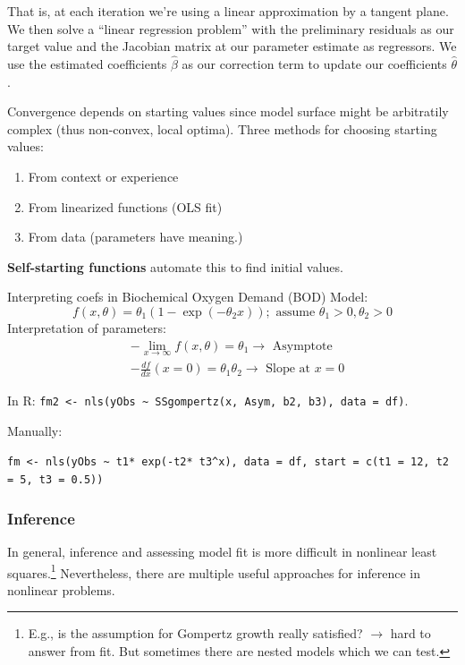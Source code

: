 \documentclass[11pt, %
	oneside, %
	english, %
	onehalfspacing, %
	]{article} %
\numberwithin{equation}{section}
\begin{document}
That is, at each iteration we're using a linear approximation by a tangent plane. We then solve a ``linear regression problem'' with the preliminary residuals as our target value and the Jacobian matrix at our parameter estimate as regressors. We use the estimated coefficients $\hat{\beta}$ as our correction term to update our coefficients $\hat{\theta}$.

Convergence depends on starting values since model surface might be arbitratily complex (thus non-convex, local optima). Three methods for choosing starting values:

\begin{enumerate}
	\item From context or experience
	\item From linearized functions (OLS fit)
	\item From data (parameters have meaning.)
\end{enumerate}

\textbf{Self-starting functions} automate this to find initial values.

\begin{example}{Interpreting coefs in Biochemical Oxygen Demand (BOD)}{}
    Model:
    $$
    f(x, \theta)=\theta_1\left(1-\exp \left(-\theta_2 x\right)\right) ; \text { assume } \theta_1>0, \theta_2>0
    $$
    Interpretation of parameters:
    $$
    \begin{aligned}
    & -\lim _{x \rightarrow \infty} f(x, \theta)=\theta_1 \rightarrow \text { Asymptote } \\
    & -\frac{d f}{d x}(x=0)=\theta_1 \theta_2 \rightarrow \text { Slope at } x=0
    \end{aligned}
    $$
\end{example}

In R: \lstinline|fm2 <- nls(yObs ~ SSgompertz(x, Asym, b2, b3), data = df)|.

Manually:

\lstinline|fm <- nls(yObs ~ t1* exp(-t2* t3^x), data = df, start = c(t1 = 12, t2 = 5, t3 = 0.5))|


\subsubsection{Inference}

In general, inference and assessing model fit is more difficult in nonlinear least squares.\footnote{E.g., is the assumption for Gompertz growth really satisfied? $\to$ hard to answer from fit. But sometimes there are nested models which we can test.} Nevertheless, there are multiple useful approaches for inference in nonlinear problems.
\end{document}
